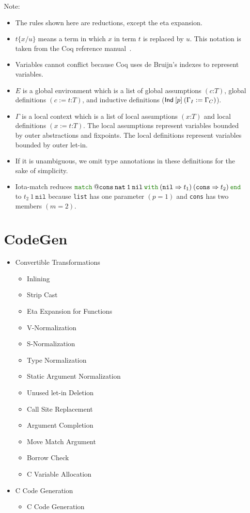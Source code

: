 \documentclass[a4paper,fleqn]{article}
\def\coq{\textrm{Coq}}
\newcommand{\kwmatch}{\mbox{\color{mygreen}\ttfamily match}}
\newcommand{\kwwith}{\mbox{\color{mygreen}\ttfamily with}}
\newcommand{\kwend}{\mbox{\color{mygreen}\ttfamily end}}
\newcommand{\gassum}[2]{(#1\mathord{:}#2)}
\newcommand{\glodef}[3]{(#1:=#2\mathord{:}#3)}
\newcommand{\lassum}[2]{(#1\mathord{:}#2)}
\newcommand{\ldef}[3]{(#1:=#2\mathord{:}#3)}
\newcommand{\subst}[3]{#1\{#2/#3\}}
\begin{document}
{\small Note:
\begin{itemize}
  \item The rules shown here are reductions, except the eta expansion.
  \item $\subst{t}{x}{u}$ means a term in which $x$ in term $t$ is replaced by $u$.
    This notation is taken from the Coq reference manual~\cite{coqrefman8.12.0}.
  \item Variables cannot conflict because \coq{} uses de Bruijn's indexes to represent variables.
  \item $E$ is a global environment which is a list of
    global assumptions $\gassum{c}{T}$,
    global definitions $\glodef{c}{t}{T}$, and
    inductive definitions ($\text{\sf Ind}\:[p]\:(\Gamma_I := \Gamma_C)$).
  \item $\Gamma$ is a local context which is a list of
    local assumptions $\lassum{x}{T}$ and
    local definitions $\ldef{x}{t}{T}$.
    The local assumptions represent variables bounded by outer abstractions and fixpoints.
    The local definitions represent variables bounded by outer let-in.
  \item If it is unambiguous, we omit type annotations in these definitions for the sake of simplicity.
  \item Iota-match reduces $\kwmatch\:\mathtt{@cons\:nat\:1\:nil}\:\kwwith\:(\mathtt{nil} \Rightarrow t_1)\:(\mathtt{cons} \Rightarrow t_2)\:\kwend$ to $t_2\:1\:\mathtt{nil}$
    because \lstinline!list! has one parameter $(p=1)$ and \lstinline!cons! has two members $(m=2)$.
\end{itemize}}

\section{CodeGen}\label{sec:codegen}

\begin{itemize}
\item Convertible Transformations
  \begin{itemize}
  \item Inlining
  \item Strip Cast
  \item Eta Expansion for Functions
  \item V-Normalization
  \item S-Normalization
  \item Type Normalization
  \item Static Argument Normalization
  \item Unused let-in Deletion
  \item Call Site Replacement
  \item Argument Completion
  \item Move Match Argument
  \item Borrow Check
  \item C Variable Allocation
  \end{itemize}
\item C Code Generation
  \begin{itemize}
  \item C Code Generation
  \end{itemize}
\end{itemize}
\end{document}
